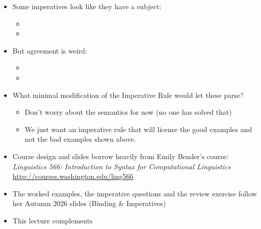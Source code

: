 \documentclass[a4paper,landscape,headrule,footrule]{foils}
\begin{document}
\begin{itemize}
\item Some imperatives look like they have a subject:
  \begin{itemize}
  \item[(i)] 
  \item[(ii)] 
  \end{itemize}
\item But agreement is weird:
  \begin{itemize}
  \item[(iii)] 
  \item[(iv)]
  \end{itemize}
\item What minimal modification of the Imperative Rule would let these parse?
  \begin{itemize}
  \item Don't worry about the semantics for now (no one has solved that)
  \item We just want an imperative rule that will license the good examples and not the bad examples shown above.
    
  \end{itemize}


  
\end{itemize}




\begin{itemize}
\item Course design and slides borrow heavily from Emily Bender's course:
\textit{Linguistics 566: Introduction to Syntax for Computational Linguistics}
\\ \url{http://courses.washington.edu/ling566}
\item The worked examples, the imperative questions and the review
  exercise follow her Autumn 2026 slides (Binding \& Imperatives)
\item This lecture complements \citet[Chapter 7]{sag:wasow:bender:2003}
\end{itemize}


%



\end{document}
